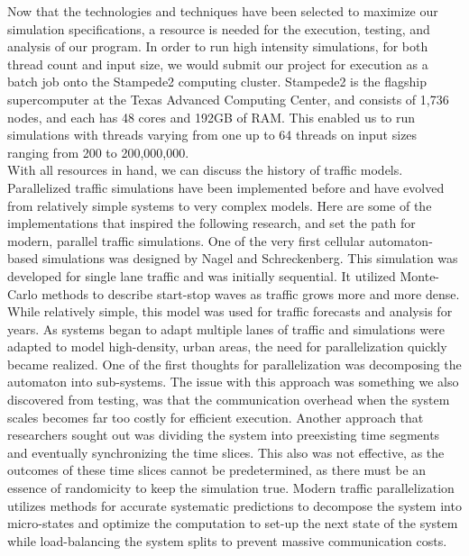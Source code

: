 \documentclass[conference]{IEEEtran}
\begin{document}
Now that the technologies and techniques have been selected to maximize our simulation specifications, a resource is needed for the execution, testing, and analysis of our program. In order to run high intensity simulations, for both thread count and input size, we would submit our project for execution as a batch job onto the Stampede2 computing cluster. Stampede2 is the flagship supercomputer at the Texas Advanced Computing Center, and consists of 1,736 nodes, and each has 48 cores and 192GB of RAM. This enabled us to run simulations with threads varying from one up to 64 threads on input sizes ranging from 200 to 200,000,000. \cite{stampede2}
 \\

With all resources in hand, we can discuss the history of traffic models. Parallelized traffic simulations have been implemented before and have evolved from relatively simple systems to very complex models.  Here are some of the implementations that inspired the following research, and set the path for modern, parallel traffic simulations. One of the very first cellular automaton-based simulations was designed by Nagel and Schreckenberg.  This simulation was developed for single lane traffic and was initially sequential.  It utilized Monte-Carlo methods to describe start-stop waves as traffic grows more and more dense.  While relatively simple, this model was used for traffic forecasts and analysis for years. As systems began to adapt multiple lanes of traffic and simulations were adapted to model high-density, urban areas, the need for parallelization quickly became realized. One of the first thoughts for parallelization was decomposing the automaton into sub-systems. The issue with this approach was something we also discovered from testing, was that the communication overhead when the system scales becomes far too costly for efficient execution.  Another approach that researchers sought out was dividing the system into preexisting time segments and eventually synchronizing the time slices. This also was not effective, as the outcomes of these time slices cannot be predetermined, as there must be an essence of randomicity to keep the simulation true.  Modern traffic parallelization utilizes methods for accurate systematic predictions to decompose the system into micro-states and optimize the computation to set-up the next state of the system while load-balancing the system splits to prevent massive communication costs. \cite{1443306} \\
\end{document}
